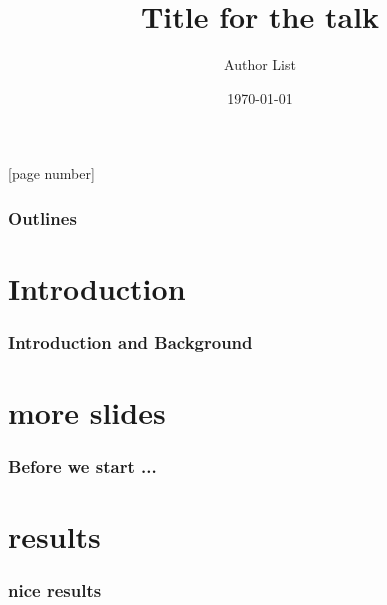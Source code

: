 \documentclass{beamer}
\title[LANS Seminar]
{Title for the talk}
\author[Speaker]{Author List}
\subtitle{}
\institute[ANL/MCS]{Argonne National Laboratory}
\date{\today}
\begin{document}
{
\frame{\titlepage}
}

[page number]{}

\begin{frame}
  \frametitle{Outlines}
  \tableofcontents
\end{frame}
\section{Introduction}
\begin{frame}
  \frametitle{Introduction and Background}
\end{frame}

\section{more slides}
\begin{frame}
  \frametitle{Before we start ...}
\end{frame}
\section{results}
\begin{frame}
  \frametitle{nice results}
\end{frame}
\end{document}
